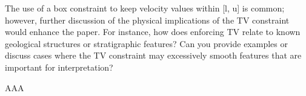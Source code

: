 \begin{point}
	The use of a box constraint to keep velocity values within [l, u] is common; however, further discussion of the physical implications of the TV constraint would enhance the paper. For instance, how does enforcing TV relate to known geological structures or stratigraphic features? Can you provide examples or discuss cases where the TV constraint may excessively smooth features that are important for interpretation?
\end{point}

\begin{reply}
	AAA
\end{reply}

